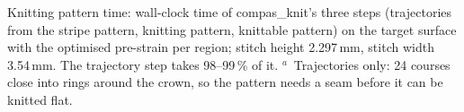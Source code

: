 \begin{landscape}
\begin{table}
\begin{tabular}{@{}llrlrrrrrr@{}}
\bottomrule
\end{tabular}
\par\smallskip
\parbox{\linewidth}{\footnotesize Knitting pattern time: wall-clock time of compas\_knit's three steps (trajectories from
the stripe pattern, knitting pattern, knittable pattern) on the target surface with the optimised pre-strain per region;
stitch height 2.297\,mm, stitch width 3.54\,mm. The trajectory step takes 98--99\,\% of it.
$^{a}$~Trajectories only: 24 courses close into rings around the crown, so the pattern needs a seam before it can be
knitted flat.}
\end{table}
\end{landscape}
